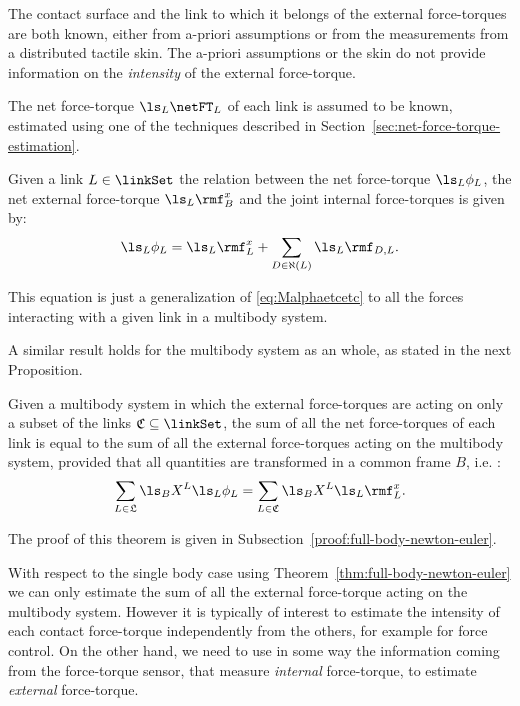 \begin{assumption}
The contact surface and the link to which it belongs of the  external force-torques are both known, either from a-priori assumptions or from the measurements from a distributed tactile skin. The a-priori assumptions or the skin do not provide information on the \emph{intensity} of the external force-torque. 
\end{assumption}

\begin{assumption}
The net force-torque $\ls_L \netFT_L$ of each link is assumed to be known, estimated using one of the techniques described in Section~\ref{sec:net-force-torque-estimation}. 
\end{assumption}


\begin{property}
\label{prop:ne-for-link-in-multibody}
Given a link $L \in \linkSet$ the relation between the net force-torque $\ls_L \phi_L$,  the net external force-torque $\ls_L \rmf^x_B$ and the joint internal force-torques is given by:
\begin{equation}
\label{eq:ne-for-link-in-multibody}
   \ls_L \phi_L = \ls_L \rmf^x_L + \sum_{D \in \aleph(L)} \ls_L \rmf_{D,L}.
\end{equation}
\end{property}
This equation is just a generalization of \eqref{eq:Malphaetcetc} to all the forces interacting with a given link in a multibody system. 

A similar result holds for the multibody system as an whole, as stated in the next Proposition. 
\begin{theorem} 
\label{thm:full-body-newton-euler}
Given a multibody system in which the external force-torques are acting on only a subset of the links $\mathfrak{C} \subseteq \linkSet$, the sum of all the net force-torques of each link is equal to the sum of all the external force-torques acting on the multibody system, provided that all quantities are transformed in a common frame $B$, i.e. :
\begin{equation}
    \label{eq:NEforEstimationCompleteModel}
    \sum_{L \in \mathfrak{L}}  \ls_B X^L \ls_L \phi_L = \sum_{L \in \mathfrak{C}} \ls_B X^L \ls_L \rmf^x_L .
\end{equation}
\end{theorem}
The proof of this theorem is given in Subsection~\ref{proof:full-body-newton-euler}.

With respect to the single body case using Theorem~\ref{thm:full-body-newton-euler} we can only estimate the sum of all the external force-torque acting on the multibody system. However it is typically of interest to estimate the intensity of each contact force-torque independently from the others, for example for force control. On the other hand, we need to use in some way the information coming from the force-torque sensor, that measure \emph{internal} force-torque, to estimate \emph{external} force-torque. 

